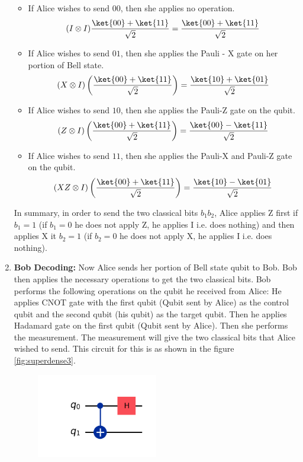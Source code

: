 \documentclass[12pt, oneside]{book}
\theoremstyle{definition}
\theoremstyle{definition}
\theoremstyle{remark}
\begin{document}
\begin{enumerate}
\begin{figure}[H]
    \end{figure}
    \begin{itemize}
        \item If Alice wishes to send $00$, then she applies no operation.
        \[
            (I\otimes I)\frac{\ket{00}+\ket{11}}{\sqrt{2}}=\frac{\ket{00}+\ket{11}}{\sqrt{2}}
        \]
        \item If Alice wishes to send $01$, then she applies the Pauli - X gate on her portion of Bell state.
        \[
            (X\otimes I)\left(\frac{\ket{00}+\ket{11}}{\sqrt{2}}\right)=\frac{\ket{10}+\ket{01}}{\sqrt{2}}
        \]
        \item If Alice wishes to send $10$, then she applies the Pauli-Z gate on the qubit.
        \[
            (Z \otimes I)\left(\frac{\ket{00}+\ket{11}}{\sqrt{2}}\right)=\frac{\ket{00}-\ket{11}}{\sqrt{2}}
        \]
        \item If Alice wishes to send $11$, then she applies the Pauli-X and Pauli-Z gate on the qubit.
        \[
            (XZ \otimes I)\left(\frac{\ket{00}+\ket{11}}{\sqrt{2}}\right)=\frac{\ket{10}-\ket{01}}{\sqrt{2}}
        \]
    \end{itemize}
    In summary, in order to send the two classical bits $b_1b_2$, Alice applies Z first if $b_1=1$ (if $b_1=0$ he does not apply Z, he applies I i.e. does nothing) and then applies X it $b_2=1$ (if $b_2=0$ he does not apply X, he applies I i.e. does nothing).
    \item \textbf{Bob Decoding: }Now Alice sends her portion of Bell state qubit to Bob. Bob then applies the necessary operations to get the two classical bits.
    Bob performs the following operations on the qubit he received from Alice:
    He applies CNOT gate with the first qubit (Qubit sent by Alice) as the control qubit and the second qubit (his qubit) as the target qubit. Then he applies Hadamard gate on the first qubit (Qubit sent by Alice).
    Then she performs the measurement. The measurement will give the two classical bits that Alice wished to send.
    This circuit for this is as shown in the figure \ref{fig:superdense3}.
    \begin{figure}[H]
        \centering
        \includegraphics[width=0.5\textwidth]{../images/superdense-coding3.png}

\end{figure}
\end{enumerate}
\end{document}
